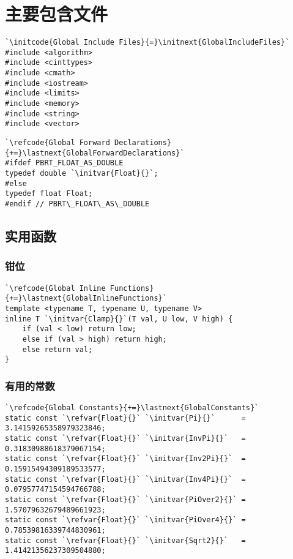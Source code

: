\section{主要包含文件}\label{sec:主要包含文件}
\begin{lstlisting}
`\initcode{Global Include Files}{=}\initnext{GlobalIncludeFiles}`
#include <algorithm>
#include <cinttypes>
#include <cmath>
#include <iostream>
#include <limits>
#include <memory>
#include <string>
#include <vector>
\end{lstlisting}

\begin{lstlisting}
`\refcode{Global Forward Declarations}{+=}\lastnext{GlobalForwardDeclarations}`
#ifdef PBRT_FLOAT_AS_DOUBLE
typedef double `\initvar{Float}{}`;
#else
typedef float Float;
#endif // PBRT\_FLOAT\_AS\_DOUBLE
\end{lstlisting}

\subsection{实用函数}\label{sub:实用函数}
\subsubsection*{钳位}
\begin{lstlisting}
`\refcode{Global Inline Functions}{+=}\lastnext{GlobalInlineFunctions}`
template <typename T, typename U, typename V>
inline T `\initvar{Clamp}{}`(T val, U low, V high) {
    if (val < low) return low;
    else if (val > high) return high;
    else return val;
}
\end{lstlisting}

\subsubsection*{有用的常数}
\begin{lstlisting}
`\refcode{Global Constants}{+=}\lastnext{GlobalConstants}`
static const `\refvar{Float}{}` `\initvar{Pi}{}`      = 3.14159265358979323846;
static const `\refvar{Float}{}` `\initvar{InvPi}{}`   = 0.31830988618379067154;
static const `\refvar{Float}{}` `\initvar{Inv2Pi}{}`  = 0.15915494309189533577;
static const `\refvar{Float}{}` `\initvar{Inv4Pi}{}`  = 0.07957747154594766788;
static const `\refvar{Float}{}` `\initvar{PiOver2}{}` = 1.57079632679489661923;
static const `\refvar{Float}{}` `\initvar{PiOver4}{}` = 0.78539816339744830961;
static const `\refvar{Float}{}` `\initvar{Sqrt2}{}`   = 1.41421356237309504880;
\end{lstlisting}

